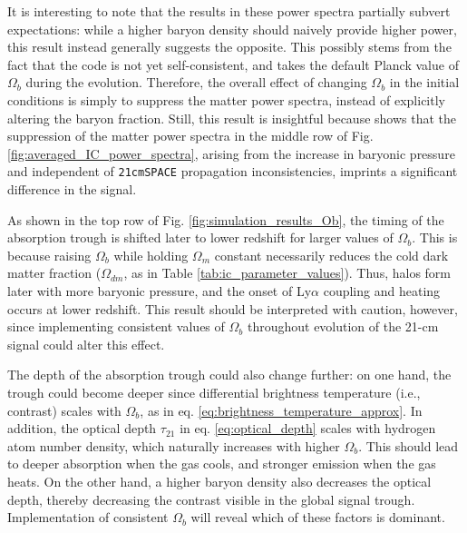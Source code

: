 \documentclass[floats,floatfix,showpacs,amssymb,prd,superscriptaddress,nofootinbib, 11pt]{revtex4-2} %
\newcommand{\code}{\texttt}
\begin{document}
It is interesting to note that the results in these power spectra partially subvert expectations: while a higher baryon density should naively provide higher power, this result instead generally suggests the opposite. This possibly stems from the fact that the code is not yet self-consistent, and takes the default Planck value of $\Omega_b$ during the evolution. Therefore, the overall effect of changing $\Omega_b$ in the initial conditions is simply to suppress the matter power spectra, instead of explicitly altering the baryon fraction. Still, this result is insightful because shows that the suppression of the matter power spectra in the middle row of Fig. \ref{fig:averaged_IC_power_spectra}, arising from the increase in baryonic pressure and independent of \code{21cmSPACE} propagation inconsistencies, imprints a significant difference in the signal.  


As shown in the top row of Fig. \ref{fig:simulation_results_Ob}, the timing of the absorption trough is shifted later to lower redshift for larger values of $\Omega_b$. This is because raising $\Omega_b$ while holding $\Omega_m$ constant necessarily reduces the cold dark matter fraction ($\Omega_{dm}$, as in Table \ref{tab:ic_parameter_values}). Thus, halos form later with more baryonic pressure, and the onset of Ly$\alpha$ coupling and heating occurs at lower redshift. This result should be interpreted with caution, however, since implementing consistent values of $\Omega_b$ throughout evolution of the 21-cm signal could alter this effect. 

The depth of the absorption trough could also change further: on one hand, the trough could become deeper since differential brightness temperature (i.e., contrast) scales with $\Omega_b$, as in eq. \ref{eq:brightness_temperature_approx}. In addition, the optical depth $\tau_{21}$ in eq. \ref{eq:optical_depth} scales with hydrogen atom number density, which naturally increases with higher $\Omega_b$. This should lead to deeper absorption when the gas cools, and stronger emission when the gas heats. On the other hand,  a higher baryon density also decreases the optical depth, thereby decreasing the contrast visible in the global signal trough. Implementation of consistent $\Omega_b$ will reveal which of these factors is dominant.
\end{document}
